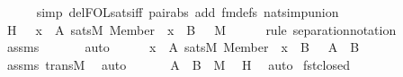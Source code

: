 \begin{isabellebody}
\ \ \ \ \isamarkupfalse%
\ {\isacharparenleft}{\kern0pt}simp\ del{\isacharcolon}{\kern0pt}FOL{\isacharunderscore}{\kern0pt}sats{\isacharunderscore}{\kern0pt}iff\ pair{\isacharunderscore}{\kern0pt}abs\ add{\isacharcolon}{\kern0pt}\ fm{\isacharunderscore}{\kern0pt}defs\ nat{\isacharunderscore}{\kern0pt}simp{\isacharunderscore}{\kern0pt}union{\isacharparenright}{\kern0pt}\ \ \isanewline
\ \ \isamarkupfalse%
\ \isamarkupfalse%
\ H\ {\isacharcolon}{\kern0pt}\ {\isachardoublequoteopen}{\isacharbraceleft}{\kern0pt}\ x\ {\isasymin}\ A{\isachardot}{\kern0pt}\ sats{\isacharparenleft}{\kern0pt}M{\isacharcomma}{\kern0pt}\ Member{\isacharparenleft}{\kern0pt}{}{\isacharcomma}{\kern0pt}\ {}{\isacharparenright}{\kern0pt}{\isacharcomma}{\kern0pt}\ {\isacharbrackleft}{\kern0pt}x{\isacharbrackright}{\kern0pt}\ {\isacharat}{\kern0pt}\ {\isacharbrackleft}{\kern0pt}B{\isacharbrackright}{\kern0pt}{\isacharparenright}{\kern0pt}\ {\isacharbraceright}{\kern0pt}\ {\isasymin}\ M{\isachardoublequoteclose}\ \isanewline
\ \ \ \ \isamarkupfalse%
{\isacharparenleft}{\kern0pt}rule\ separation{\isacharunderscore}{\kern0pt}notation{\isacharparenright}{\kern0pt}\ \isanewline
\ \ \ \ \isamarkupfalse%
\ assms\ \isanewline
\ \ \ \ \isamarkupfalse%
\ auto\ \isanewline
\ \ \isamarkupfalse%
\ {\isachardoublequoteopen}{\isacharbraceleft}{\kern0pt}\ x\ {\isasymin}\ A{\isachardot}{\kern0pt}\ sats{\isacharparenleft}{\kern0pt}M{\isacharcomma}{\kern0pt}\ Member{\isacharparenleft}{\kern0pt}{}{\isacharcomma}{\kern0pt}\ {}{\isacharparenright}{\kern0pt}{\isacharcomma}{\kern0pt}\ {\isacharbrackleft}{\kern0pt}x{\isacharbrackright}{\kern0pt}\ {\isacharat}{\kern0pt}\ {\isacharbrackleft}{\kern0pt}B{\isacharbrackright}{\kern0pt}{\isacharparenright}{\kern0pt}\ {\isacharbraceright}{\kern0pt}\ {\isacharequal}{\kern0pt}\ A\ {\isasyminter}\ B{\isachardoublequoteclose}\ \isanewline
\ \ \ \ \isamarkupfalse%
\ assms\ transM\ \isamarkupfalse%
\ auto\ \isanewline
\ \ \isamarkupfalse%
\ \isamarkupfalse%
\ {\isachardoublequoteopen}A\ {\isasyminter}\ B\ {\isasymin}\ M{\isachardoublequoteclose}\ \isamarkupfalse%
\ H\ \isamarkupfalse%
\ auto\isanewline
{}\isamarkupfalse%
%
\endisatagproof
{\isafoldproof}%
%
\isadelimproof
\isanewline
%
\endisadelimproof
\isanewline
{}\isamarkupfalse%
\ fst{\isacharunderscore}{\kern0pt}closed\ {\isacharcolon}{\kern0pt}\ \isanewline

\end{isabellebody}
